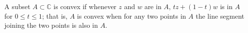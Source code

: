 A subset $A \subset \mathbb{C}$ is convex if whenever $z$ and $w$ are in $A$, $tz + (1-t)w$ is in $A$ for $0 \leq t \leq 1$; that is, $A$ is convex when for any two points in $A$ the line segment joining the two points is also in $A$.
